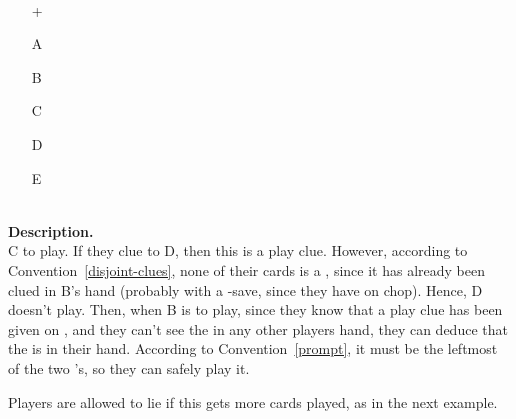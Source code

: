 \begin{example} \hfill \\
	\begin{minipage}{0.45\textwidth}
		\begin{itemize}
			\item[\Large +]      
			\item[\Large A]    
			\item[\Large B]    
			\item[\Large C]    
			\item[\Large D]    
			\item[\Large E]    
		\end{itemize}
	\end{minipage}%
	\begin{minipage}{0.55\textwidth}
		\hfill \\
		
		\textbf{Description.} \\
		
		C to play. If they clue  to D, then this is a play clue. However, according to Convention~\ref{disjoint-clues}, none of their cards is a , since it has already been clued in B's hand (probably with a -save, since they have  on chop). Hence, D doesn't play. Then, when B is to play, since they know that a play clue has been given on , and they can't see the  in any other players hand, they can deduce that the  is in their hand. According to Convention~\ref{prompt}, it must be the leftmost of the two 's, so they can safely play it.
	\end{minipage}
\end{example} \vspace{0.15 cm}

Players are allowed to lie if this gets more cards played, as in the next example.

